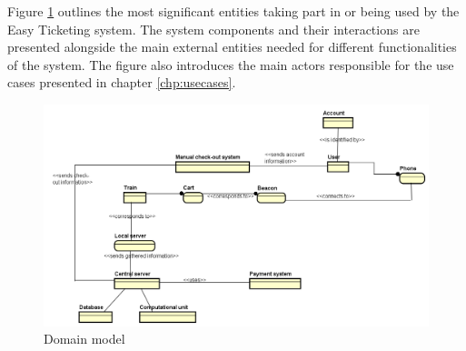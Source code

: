 
Figure \ref{fig:domain_model} outlines the most significant entities taking part in or being used by the Easy Ticketing system. The system components and their interactions are presented alongside the main external entities needed for different functionalities of the system. The figure also introduces the main actors responsible for the use cases presented in chapter \ref{chp:usecases}.

\begin{figure}[H]
	\centering
	\includegraphics[width=\textwidth]{Pictures/domain_model.png}
	\caption{Domain model}
	\label{fig:domain_model}
\end{figure}